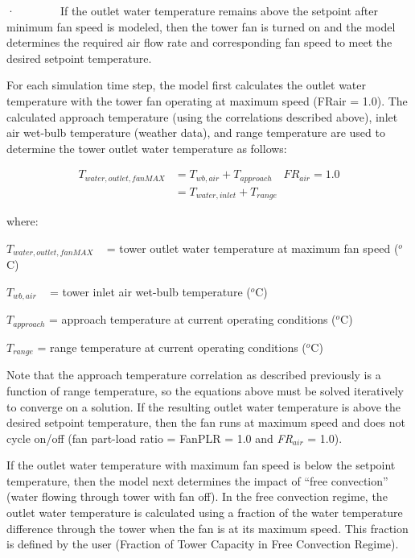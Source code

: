·~~~~~~~~If the outlet water temperature remains above the setpoint after minimum fan speed is modeled, then the tower fan is turned on and the model determines the required air flow rate and corresponding fan speed to meet the desired setpoint temperature.

For each simulation time step, the model first calculates the outlet water temperature with the tower fan operating at maximum speed (FRair = 1.0). The calculated approach temperature (using the correlations described above), inlet air wet-bulb temperature (weather data), and range temperature are used to determine the tower outlet water temperature as follows:

\begin{equation}
  \begin{array}{rl}
    T_{water,outlet,fanMAX} &= T_{wb,air} + T_{approach} \quad FR_{air} = 1.0 \\
                              &= {T_{water,inlet}} + {T_{range}}
  \end{array}
\end{equation}

where:

\({T_{water,outlet,fanMAX}}\) ~ = tower outlet water temperature at maximum fan speed (\(^{o}\)C)

\({T_{wb,air}}\) ~ = tower inlet air wet-bulb temperature (\(^{o}\)C)

\({T_{approach}}\) = approach temperature at current operating conditions (\(^{o}\)C)

\({T_{range}}\) = range temperature at current operating conditions (\(^{o}\)C)

Note that the approach temperature correlation as described previously is a function of range temperature, so the equations above must be solved iteratively to converge on a solution. If the resulting outlet water temperature is above the desired setpoint temperature, then the fan runs at maximum speed and does not cycle on/off (fan part-load ratio = FanPLR = 1.0 and \emph{FR\(_{air}\)} = 1.0).

If the outlet water temperature with maximum fan speed is below the setpoint temperature, then the model next determines the impact of ``free convection'' (water flowing through tower with fan off). In the free convection regime, the outlet water temperature is calculated using a fraction of the water temperature difference through the tower when the fan is at its maximum speed. This fraction is defined by the user (Fraction of Tower Capacity in Free Convection Regime).

